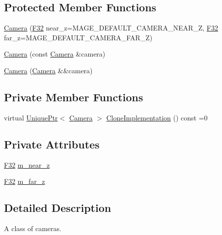 \subsection*{Protected Member Functions}
\begin{DoxyCompactItemize}
\item 
\hyperlink{classmage_1_1_camera_adb5cd01b5d55527b919fb3920d8be7e8}{Camera} (\hyperlink{namespacemage_aa97e833b45f06d60a0a9c4fc22ae02c0}{F32} near\+\_\+z=M\+A\+G\+E\+\_\+\+D\+E\+F\+A\+U\+L\+T\+\_\+\+C\+A\+M\+E\+R\+A\+\_\+\+N\+E\+A\+R\+\_\+Z, \hyperlink{namespacemage_aa97e833b45f06d60a0a9c4fc22ae02c0}{F32} far\+\_\+z=M\+A\+G\+E\+\_\+\+D\+E\+F\+A\+U\+L\+T\+\_\+\+C\+A\+M\+E\+R\+A\+\_\+\+F\+A\+R\+\_\+Z)
\item 
\hyperlink{classmage_1_1_camera_a28d9280bd7067ec4d28392558cc2b767}{Camera} (const \hyperlink{classmage_1_1_camera}{Camera} \&camera)
\item 
\hyperlink{classmage_1_1_camera_a4dc6f31c108b28abe9580ef6d7a06713}{Camera} (\hyperlink{classmage_1_1_camera}{Camera} \&\&camera)
\end{DoxyCompactItemize}
\subsection*{Private Member Functions}
\begin{DoxyCompactItemize}
\item 
virtual \hyperlink{namespacemage_a3316d7143a973e37adf1110f2e80ca31}{Unique\+Ptr}$<$ \hyperlink{classmage_1_1_camera}{Camera} $>$ \hyperlink{classmage_1_1_camera_aedf6e7d6ee6c6e9e82da814ef8e705ab}{Clone\+Implementation} () const =0
\end{DoxyCompactItemize}
\subsection*{Private Attributes}
\begin{DoxyCompactItemize}
\item 
\hyperlink{namespacemage_aa97e833b45f06d60a0a9c4fc22ae02c0}{F32} \hyperlink{classmage_1_1_camera_a8ae2c8fbe94cb6f8c4cd4a2811900b83}{m\+\_\+near\+\_\+z}
\item 
\hyperlink{namespacemage_aa97e833b45f06d60a0a9c4fc22ae02c0}{F32} \hyperlink{classmage_1_1_camera_a1073445c77b3224cd62613ae83853fe3}{m\+\_\+far\+\_\+z}
\end{DoxyCompactItemize}


\subsection{Detailed Description}
A class of cameras. 

